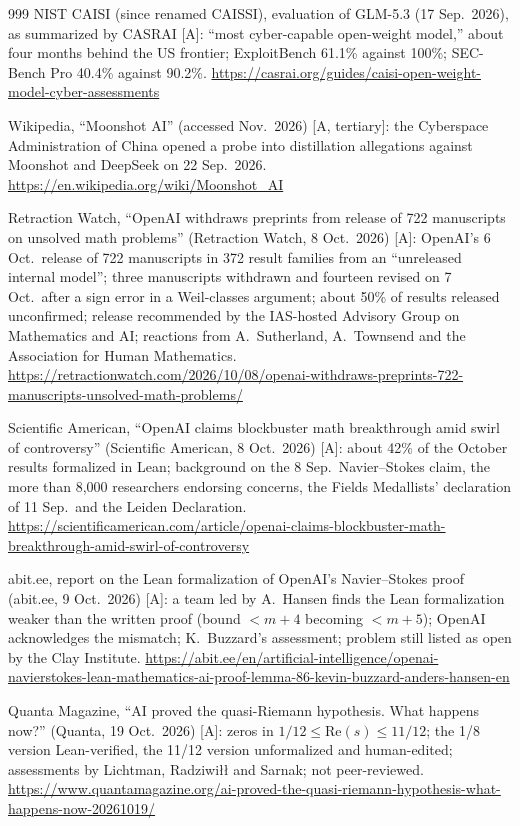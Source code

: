 \begin{thebibliography}{999}
 NIST CAISI (since renamed CAISSI), evaluation of GLM-5.3 (17 Sep.\ 2026), as summarized by CASRAI [A]: ``most cyber-capable open-weight model,'' about four months behind the US frontier; ExploitBench 61.1\% against 100\%; SEC-Bench Pro 40.4\% against 90.2\%. \url{https://casrai.org/guides/caisi-open-weight-model-cyber-assessments}

 Wikipedia, ``Moonshot AI'' (accessed Nov.\ 2026) [A, tertiary]: the Cyberspace Administration of China opened a probe into distillation allegations against Moonshot and DeepSeek on 22 Sep.\ 2026. \url{https://en.wikipedia.org/wiki/Moonshot_AI}

 Retraction Watch, ``OpenAI withdraws preprints from release of 722 manuscripts on unsolved math problems'' (Retraction Watch, 8 Oct.\ 2026) [A]: OpenAI's 6 Oct.\ release of 722 manuscripts in 372 result families from an ``unreleased internal model''; three manuscripts withdrawn and fourteen revised on 7 Oct.\ after a sign error in a Weil-classes argument; about 50\% of results released unconfirmed; release recommended by the IAS-hosted Advisory Group on Mathematics and AI; reactions from A.~Sutherland, A.~Townsend and the Association for Human Mathematics. \url{https://retractionwatch.com/2026/10/08/openai-withdraws-preprints-722-manuscripts-unsolved-math-problems/}

 Scientific American, ``OpenAI claims blockbuster math breakthrough amid swirl of controversy'' (Scientific American, 8 Oct.\ 2026) [A]: about 42\% of the October results formalized in Lean; background on the 8 Sep.\ Navier--Stokes claim, the more than 8,000 researchers endorsing concerns, the Fields Medallists' declaration of 11 Sep.\ and the Leiden Declaration. \url{https://scientificamerican.com/article/openai-claims-blockbuster-math-breakthrough-amid-swirl-of-controversy}

 abit.ee, report on the Lean formalization of OpenAI's Navier--Stokes proof (abit.ee, 9 Oct.\ 2026) [A]: a team led by A.~Hansen finds the Lean formalization weaker than the written proof (bound $<m+4$ becoming $<m+5$); OpenAI acknowledges the mismatch; K.~Buzzard's assessment; problem still listed as open by the Clay Institute. \url{https://abit.ee/en/artificial-intelligence/openai-navierstokes-lean-mathematics-ai-proof-lemma-86-kevin-buzzard-anders-hansen-en}

 Quanta Magazine, ``AI proved the quasi-Riemann hypothesis. What happens now?'' (Quanta, 19 Oct.\ 2026) [A]: zeros in $1/12 \le \mathrm{Re}(s) \le 11/12$; the 1/8 version Lean-verified, the 11/12 version unformalized and human-edited; assessments by Lichtman, Radziwi\l\l{} and Sarnak; not peer-reviewed. \url{https://www.quantamagazine.org/ai-proved-the-quasi-riemann-hypothesis-what-happens-now-20261019/}


\end{thebibliography}

